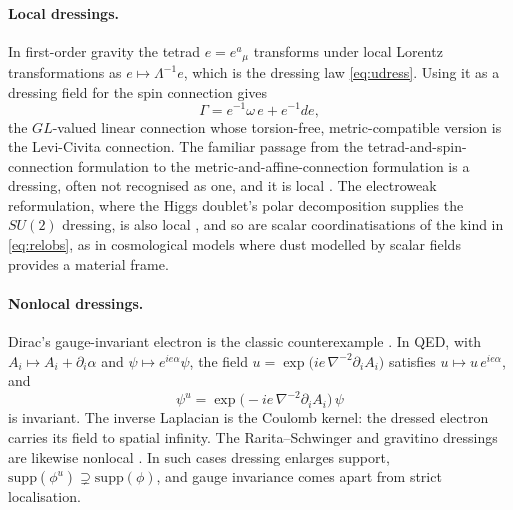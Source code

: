 \documentclass[11pt]{article}
\theoremstyle{plain}
\theoremstyle{definition}
\theoremstyle{remark}
\begin{document}
\paragraph{Local dressings.} In first-order gravity the tetrad $e=e^a{}_\mu$ transforms under local Lorentz transformations as $e\mapsto\Lambda^{-1}e$, which is the dressing law \eqref{eq:udress}. Using it as a dressing field for the spin connection gives
\begin{equation}
\Gamma=e^{-1}\omega\, e+e^{-1}de,
\end{equation}
the $GL$-valued linear connection whose torsion-free, metric-compatible version is the Levi-Civita connection. The familiar passage from the tetrad-and-spin-connection formulation to the metric-and-affine-connection formulation is a dressing, often not recognised as one, and it is local \cite{toe,ravera-notes}. The electroweak reformulation, where the Higgs doublet's polar decomposition supplies the $SU(2)$ dressing, is also local \cite{berghofer-elements}, and so are scalar coordinatisations of the kind in \eqref{eq:relobs}, as in cosmological models where dust modelled by scalar fields provides a material frame.

\paragraph{Nonlocal dressings.} Dirac's gauge-invariant electron is the classic counterexample \cite{dirac1955}. In QED, with $A_i\mapsto A_i+\partial_i\alpha$ and $\psi\mapsto e^{ie\alpha}\psi$, the field $u=\exp\!\big(ie\,\nabla^{-2}\partial_iA_i\big)$ satisfies $u\mapsto u\,e^{ie\alpha}$, and
\begin{equation}
\psi^u=\exp\!\big(-ie\,\nabla^{-2}\partial_iA_i\big)\,\psi
\end{equation}
is invariant. The inverse Laplacian is the Coulomb kernel: the dressed electron carries its field to spatial infinity. The Rarita--Schwinger and gravitino dressings are likewise nonlocal \cite{fr-rs}. In such cases dressing enlarges support, $\mathrm{supp}(\phi^u)\supsetneq\mathrm{supp}(\phi)$, and gauge invariance comes apart from strict localisation.
\end{document}
